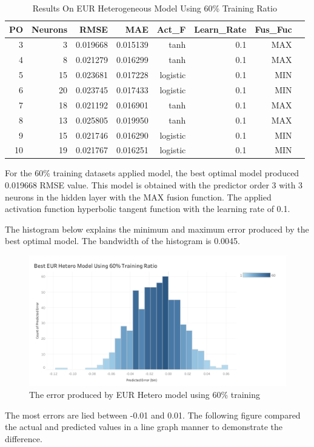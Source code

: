 {{{{{{{{{{{{{{		\setlength{\tabcolsep}{0.5em} %
		{\renewcommand{\arraystretch}{1.2}
			
			\begin{table}[ht]
				\centering
				\begin{tabular}{@{}rrrrrrrr@{}}
					\toprule
					\textbf{PO}&\textbf{Neurons}& \textbf{RMSE} & \textbf{MAE} & \textbf{Act\_F}  & \textbf{Learn\_Rate} &\textbf{ Fus\_Fuc}\\ 
					\midrule
					 3 & 3 & 0.019668 & 0.015139 & tanh & 0.1 & MAX \\ 
					 4 & 8 & 0.021279 & 0.016299 & tanh & 0.1 & MAX \\ 
					 5 & 15 & 0.023681 & 0.017228 & logistic & 0.1 & MIN \\ 
					 6 & 20 & 0.023745 & 0.017433 & logistic & 0.1 & MIN \\ 
					 7 & 18 & 0.021192 & 0.016901 & tanh & 0.1 & MAX \\ 
					 8 & 13 & 0.025805 & 0.019950 & tanh & 0.1 & MAX \\ 
					 9 & 15 & 0.021746 & 0.016290 & logistic & 0.1 & MIN \\ 
					 10 & 19 & 0.021767 & 0.016251 & logistic & 0.1 & MIN \\ 
					\hline
				\end{tabular}
				\hspace*{1cm}
				\caption{Results On EUR Heterogeneous Model Using 60\% Training Ratio}
			\end{table}
			
For the 60\% training datasets applied model, the best optimal model produced 0.019668 RMSE value.  This model is obtained with the predictor order 3 with 3 neurons in the hidden layer with the MAX fusion function. The applied activation function hyperbolic tangent function with the learning rate of 0.1.
			
The histogram below explains the minimum and maximum error produced by the best optimal model. The bandwidth of the histogram is 0.0045.
			
			\begin{figure}[hbt!]\centering
				\includegraphics[width=1\textwidth]{hetero_eur_60}
				\caption{The error produced by EUR Hetero model using 60\% training}
			\end{figure}
			\pagebreak
The most errors are lied between -0.01 and 0.01. The following figure compared the actual and predicted values in a line graph manner to demonstrate the difference.
			
}}}}}}}}}}}}}}}
